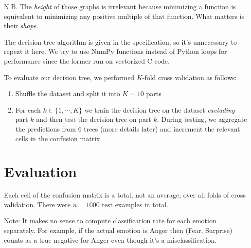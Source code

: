 \documentclass[12pt, a4paper]{article}
\begin{document}
N.B. The \textit{height} of those graphs is irrelevant because minimizing a function is equivalent to minimizing any positive multiple of that function. What matters is their \textit{shape}.\par
\bigskip
The decision tree algorithm is given in the specification, so it's unnecessary to repeat it here. We try to use NumPy functions instead of Python loops for performance since the former run on vectorized C code.\par
\bigskip
To evaluate our decision tree, we performed $K$-fold cross validation as follows:
\begin{enumerate}
    \item Shuffle the dataset and split it into $K = 10$ parts
    \item For each $k \in \{1, \dotsm, K\}$ we train the decision tree on the dataset \textit{excluding} part $k$ and then test the decision tree on part $k$. During testing, we aggregate the predictions from 6 trees (more details later) and increment the relevant cells in the confusion matrix.
\end{enumerate}

\section*{Evaluation}
Each cell of the confusion matrix is a total, not an average, over all folds of cross validation. There were $n = 1000$ test examples in total.\par
\bigskip
Note: It makes no sense to compute classification rate for each emotion separately. For example, if the actual emotion is Anger then (Fear, Surprise) counts as a true negative for Anger even though it's a misclassification.
\bigskip
\end{document}
